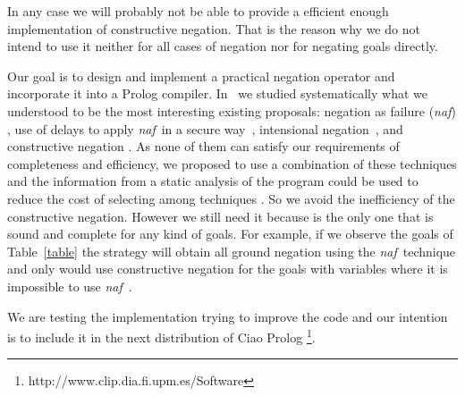 \documentclass{llncs}
\newcommand{\naf}{{\em naf}}\newcommand{\viejo}[1]{}
\begin{document}
In any case we will probably not be able to provide a efficient enough
implementation of constructive negation. That is the reason why we do
not intend to use it neither for all cases of negation nor for
negating goals directly.

Our goal is to design and implement a practical negation operator and
incorporate it into a Prolog compiler.
In~\cite{SusanaPADL2000,SusanaLPAR01} we studied systematically what
we understood to be the most interesting existing proposals: negation
as failure (\naf) \cite{Clark}, use of delays to apply \naf\ in a
secure way~\cite{naish:lncs}, intensional
negation~\cite{Barbuti1,Barbuti2}, and constructive negation
\cite{Chan1,Chan2,Drabent,Stuckey,Stuckey95}. As none of them can
satisfy our requirements of completeness and efficiency, we proposed
to use a combination of these techniques and the information from a
static analysis of the program could be used to reduce the cost of
selecting among techniques \cite{SusanaLPAR01}. So we avoid the
inefficiency of the constructive negation. However we still need it because
is the only one that is sound and complete for
any kind of goals. For example, if we observe the goals of
Table~\ref{table} the strategy will obtain all ground negation using
the \naf\ technique and only would use constructive negation for the
goals with variables where it is impossible to use \naf\ . 

We are testing the implementation trying to improve the code and our
intention is to include it in the next distribution of Ciao Prolog
\footnote{http://www.clip.dia.fi.upm.es/Software}.
  


 \begin{small}

     
    

 \end{small}


\end{document}
